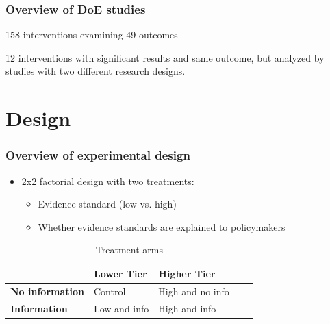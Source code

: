 \documentclass[usenames,dvipsnames]{beamer}
\begin{document}

\begin{frame}
\frametitle{Overview of DoE studies}

158 interventions examining 49 outcomes %

\textcolor{Cerulean}{12} interventions with significant results and same outcome, but analyzed by studies with two different research designs.

\vspace{-4mm}
\captionsetup{labelformat=empty}


\end{frame}


\section{Design}

\begin{frame}
\frametitle{Overview of experimental design}

\begin{itemize}
\item 2x2 factorial design with two treatments:
\begin{itemize}
\item Evidence standard (low vs. high)
\item Whether evidence standards are explained to policymakers
\end{itemize}
\end{itemize}

\vspace{5mm}
\begin{table}[H]
\centering
\caption{Treatment arms}
\label{tab: arms} 
\bigbreak
\begin{tabular}{|l|l|l|l|l|}
\hline
& \textbf{Lower Tier} & \textbf{Higher Tier} \\ \hline
\textbf{No information} & Control & High and no info \\ \hline
\textbf{Information} & Low and info & High and info \\ \hline
\end{tabular}
\end{table}

\end{frame}


\end{document}
